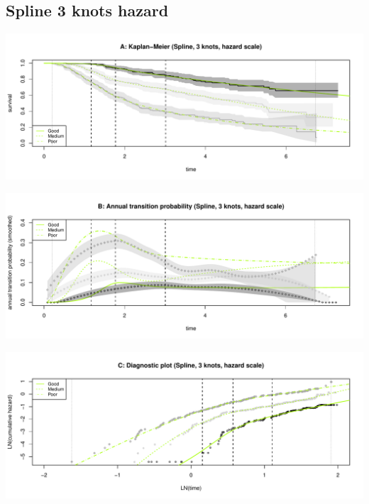 \documentclass[]{article}
\begin{document}
\newpage 

\subsection{Spline 3 knots hazard}\label{spline-3-knots-hazard}

\begin{flushleft}\includegraphics[height=0.25\textheight]{Images/spline_hazard3-1} \end{flushleft}

\begin{flushleft}\includegraphics[height=0.25\textheight]{Images/spline_hazard3-2} \end{flushleft}

\begin{flushleft}\includegraphics[height=0.25\textheight]{Images/spline_hazard3-3} \end{flushleft}
\end{document}
